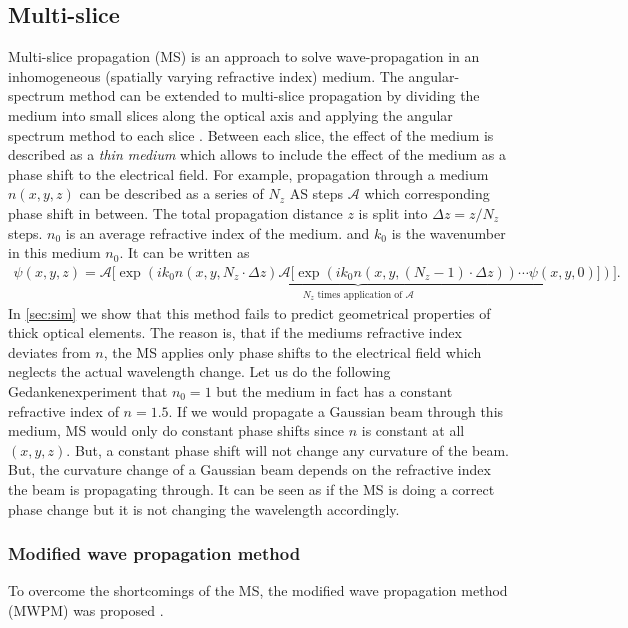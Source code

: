 \documentclass[a4paper,12pt]{article}
\begin{document}
\subsection{Multi-slice}
Multi-slice propagation (MS) is an approach to solve wave-propagation in an inhomogeneous (spatially varying refractive index) medium. 
The angular-spectrum method can be extended to multi-slice propagation by dividing the medium into small slices along the optical axis and applying the angular spectrum method to each slice \cite{https://doi.org/10.1107/S0365110X57002194,Li_Wojcik_Jacobsen_2017}. Between each slice, the effect of the medium is 
described as a \textit{thin medium} which allows to include the effect of the medium as a phase shift to the electrical field.
For example, propagation through a medium $n(x,y,z)$ can be described as a series of $N_z$ AS steps $\mathcal{A}$ which corresponding phase shift in between.
The total propagation distance $z$ is split into $\Delta z = z / N_z$ steps.
$n_0$ is an average refractive index of the medium. and $k_0$ is the wavenumber in this medium $n_0$. It can be written as
\begin{align}
    \psi(x,y,z) = \underbrace{\mathcal{A}\bigg[\exp\left(i k_0 n(x,y, N_z \cdot \Delta z)\mathcal{A}\big[\exp\left(i k_0 n(x,y, (N_z - 1) \cdot \Delta z) \right) \cdots \psi(x,y, 0) \big] \right) \bigg]}_{N_z \text{ times application of }\mathcal{A}}. 
\end{align}
In \autoref{sec:sim} we show that this method fails to predict geometrical properties of thick optical elements.
The reason is, that if the mediums refractive index deviates from $n$, the MS applies only phase shifts to the electrical field which neglects the actual wavelength change.
Let us do the following Gedankenexperiment that $n_0 = 1$ but the medium in fact has a constant refractive index of $n=1.5$. If we would
propagate a Gaussian beam through this medium, MS would only do constant phase shifts since $n$ is constant at all $(x,y,z)$. But, a constant phase shift will not change any curvature of the beam. But, the curvature change of a Gaussian beam depends on the refractive index the beam is propagating through. It can be seen as if the MS is doing a correct phase change but it is not changing the wavelength accordingly. 

\subsubsection{Modified wave propagation method}
To overcome the shortcomings of the MS, the modified wave propagation method (MWPM) was proposed \cite{schmidt2016wave}.
\end{document}
